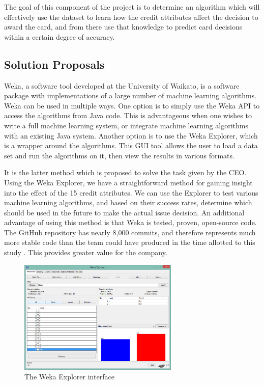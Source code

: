 \documentclass[11pt,journal]{IEEEtran}
\begin{document}
\par
The goal of this component of the project is to determine an algorithm which will effectively use the dataset to learn how the credit attributes affect the decision to award the card, and from there use that knowledge to predict card decisions within a certain degree of accuracy.

\subsection{Solution Proposals}
Weka, a software tool developed at the University of Waikato, is a software package with implementations of a large number of machine learning algorithms. Weka can be used in multiple ways. One option is to simply use the Weka API to access the algorithms from Java code. This is advantageous when one wishes to write a full machine learning system, or integrate machine learning algorithms with an existing Java system. Another option is to use the Weka Explorer, which is a wrapper around the algorithms. This GUI tool allows the user to load a data set and run the algorithms on it, then view the results in various formats.
\par
It is the latter method which is proposed to solve the task given by the CEO. Using the Weka Explorer, we have a straightforward method for gaining insight into the effect of the 15 credit attributes. We can use the Explorer to test various machine learning algorithms, and based on their success rates, determine which should be used in the future to make the actual issue decision. An additional advantage of using this method is that Weka is tested, proven, open-source code. The GitHub repository has nearly 8,000 commits, and therefore represents much more stable code than the team could have produced in the time allotted to this study \cite{wekagit}. This provides greater value for the company.

\begin{figure}[H]
\centering
    \includegraphics[width=3in]{images/wekaexplorer}
\caption{The Weka Explorer interface}
\label{wekaexplorer}
\end{figure}
\end{document}
